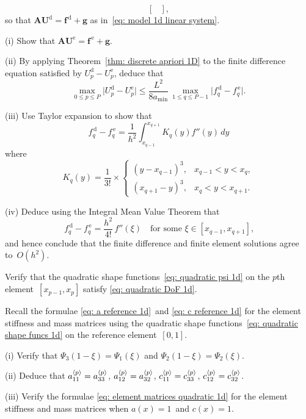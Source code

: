 \begin{Exercises}
\[\begin{bmatrix}
\end{bmatrix},
\]
so that $\boldsymbol{A}\boldsymbol{U}^{\mathrm{d}}=\boldsymbol{f}^{\,\mathrm{d}}
+\boldsymbol{g}$ as in~\eqref{eq: model 1d linear system}.
\begin{description}
\item{(i)} Show that $\boldsymbol{A}\boldsymbol{U}^{\mathrm{e}}
=\boldsymbol{f}^{\,\mathrm{e}}+\boldsymbol{g}$.
\item{(ii)} By applying Theorem~\ref{thm: discrete apriori 1D} to the finite 
difference equation satisfied by $U^{\mathrm{d}}_p-U^{\mathrm{e}}_p$, deduce 
that
\[
\max_{0\le p\le P}\bigl|U^{\mathrm{d}}_p-U^{\mathrm{e}}_p\bigr|
    \le\frac{L^2}{8a_{\mathrm{min}}}\,\max_{1\le q\le P-1}
    \bigl|f^{\,\mathrm{d}}_q-f^{\,\mathrm{e}}_q\bigr|.
\]
\item{(iii)}
Use Taylor expansion to show that
\[
f^{\,\mathrm{d}}_q-f^{\,\mathrm{e}}_q=\frac{1}{h^2}\int_{x_{q-1}}^{x_{q+1}}
    K_q(y)f''(y)\,dy
\]
where
\[
K_q(y)=\frac{1}{3!}\times\begin{cases}
        (y-x_{q-1})^3,&x_{q-1}<y<x_q,\\
        (x_{q+1}-y)^3,&x_q<y<x_{q+1}.
\end{cases}
\]
\item{(iv)}
Deduce using the Integral Mean Value Theorem that
\[
f^{\,\mathrm{d}}_q-f^{\,\mathrm{e}}_q=\frac{h^2}{4!}\,f''(\xi)
\quad\text{for some $\xi\in[x_{q-1},x_{q+1}]$,}
\]
and hence conclude that the finite difference and finite element solutions 
agree to~$O(h^2)$.
\end{description}

\exercise\label{ex: quadratic DoF 1d}
Verify that the quadratic shape functions~\eqref{eq: quadratic psi 1d} on the 
$p$th element~$[x_{p-1},x_p]$ satisfy \eqref{eq: quadratic DoF 1d}.

\exercise
Recall the formulae \eqref{eq: a reference 1d}~and
\eqref{eq: c reference 1d} for the element stiffness and mass matrices using 
the quadratic shape functions~\eqref{eq: quadratic shape funcs 1d} on the 
reference element~$[0,1]$. 
\begin{description}
\item{(i)} Verify that $\Psi_3(1-\xi)=\Psi_1(\xi)$ and 
$\Psi_2(1-\xi)=\Psi_2(\xi)$.
\item{(ii)} Deduce that
$a^{\langle p\rangle}_{11}=a^{\langle p\rangle}_{33}$, $a^{\langle p\rangle}_{12}=a^{\langle p\rangle}_{32}$,
$c^{\langle p\rangle}_{11}=c^{\langle p\rangle}_{33}$, $c^{\langle p\rangle}_{12}=c^{\langle p\rangle}_{32}$.
\item{(iii)} Verify the formulae \eqref{eq: element matrices quadratic 1d}
for the element stiffness and mass matrices when $a(x)=1$~and $c(x)=1$.
\end{description}


\end{Exercises}
